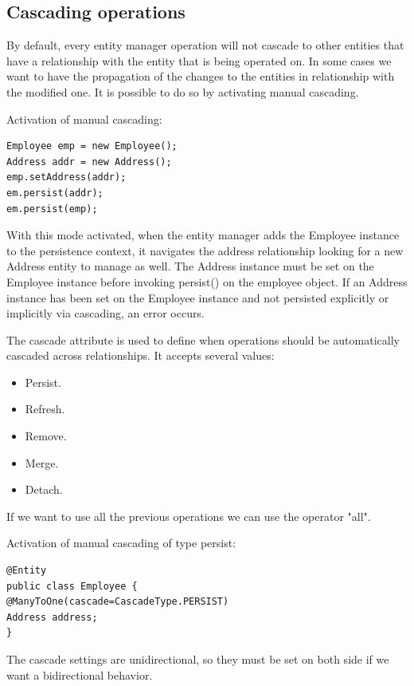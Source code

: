 \subsection*{Cascading operations}
By default, every entity manager operation will not cascade to other entities that have a relationship with the entity that is being operated on. In some cases we want 
to have the propagation of the changes to the entities in relationship with the modified one. It is possible to do so by activating manual cascading. 
\begin{example}
    Activation of manual cascading: 
    \begin{lstlisting}[style=Java]
Employee emp = new Employee();
Address addr = new Address();
emp.setAddress(addr);
em.persist(addr);
em.persist(emp);
    \end{lstlisting}
    With this mode activated, when the entity manager adds the Employee instance to the persistence context, it navigates the address relationship looking for a 
    new Address entity to manage as well. The Address instance must be set on the Employee instance before invoking persist() on the employee object. If an Address 
    instance has been set on the Employee instance and not persisted explicitly or implicitly via cascading, an error occurs.
\end{example}
The cascade attribute is used to define when operations should be automatically cascaded across relationships. It accepts several values: 
\begin{itemize}
    \item Persist. 
    \item Refresh. 
    \item Remove.
    \item Merge.
    \item Detach.
\end{itemize}
If we want to use all the previous operations we can use the operator "all". 
\begin{example}
    Activation of manual cascading of type persist: 
    \begin{lstlisting}[style=Java]
@Entity
public class Employee {
@ManyToOne(cascade=CascadeType.PERSIST)
Address address;
}
    \end{lstlisting}
\end{example}
The cascade settings are unidirectional, so they must be set on both side if we want a bidirectional behavior. 

